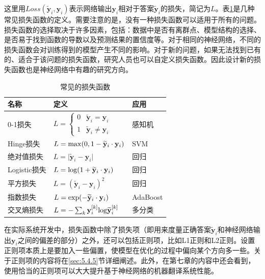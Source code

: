 \parinterval 这里用$ Loss(\mathbf {\widetilde y}_i,\mathbf y_i) $表示网络输出$ \mathbf y_i $相对于答案$ \mathbf {\widetilde y}_i $的损失，简记为$ L $。表\ref{tab:5-3}是几种常见损失函数的定义。需要注意的是，没有一种损失函数可以适用于所有的问题。损失函数的选择取决于许多因素，包括：数据中是否有离群点、模型结构的选择、是否易于找到函数的导数以及预测结果的置信度等。对于相同的神经网络，不同的损失函数会对训练得到的模型产生不同的影响。对于新的问题，如果无法找到已有的、适合于该问题的损失函数，研究人员也可以自定义损失函数。因此设计新的损失函数也是神经网络中有趣的研究方向。

\begin{table}[htp]
\centering
\caption{常见的损失函数}
\label{tab:5-3}
\small
\begin{tabular}{l | l l}
\rule{0pt}{15pt}     名称 & 定义 & 应用  \\
\hline
\rule{0pt}{15pt}     0-1损失 & $ L=\begin{cases} 0 & \mathbf {\widetilde y}_i=\mathbf y_i \\1 & \mathbf {\widetilde y}_i\not =\mathbf y_i\end{cases} $ & 感知机  \\
\rule{0pt}{15pt}     Hinge损失 & $ L={\rm {max}}(0,1-\mathbf {\widetilde y}_i\cdot \mathbf y_i) $ & SVM  \\
\rule{0pt}{15pt}     绝对值损失 & $ L=\vert \mathbf {\widetilde y}_i-\mathbf y_i\vert $ & 回归  \\
\rule{0pt}{15pt}     Logistic损失 & $ L={\rm{log}}(1+\mathbf {\widetilde y}_i\cdot \mathbf y_i) $ & 回归  \\
\rule{0pt}{15pt}     平方损失 & $ L={(\mathbf {\widetilde y}_i-\mathbf y_i)}^2 $ & 回归  \\
\rule{0pt}{15pt}     指数损失 & $ L={\rm{exp}}(-\mathbf {\widetilde y}_i\cdot \mathbf y_i) $ & AdaBoost  \\
\rule{0pt}{15pt}     交叉熵损失 & $ L=-\sum_{k}{\mathbf y_i^{[k]}{\rm {log}}\mathbf {\widetilde y}_i^{[k]}} $ & 多分类  \\
\end{tabular}
\end{table}

\parinterval 在实际系统开发中，损失函数中除了损失项（即用来度量正确答案$ \mathbf {\widetilde y}_i $和神经网络输出$ \mathbf y_i $之间的偏差的部分）之外，还可以包括正则项，比如L1正则和L2正则。设置正则项本质上是要加入一些偏置，使模型在优化的过程中偏向某个方向多一些。关于正则项的内容将在\ref{sec:5.4.5}节详细阐述。此外，在第七章的内容中还会看到，使用恰当的正则项可以大大提升基于神经网络的机器翻译系统性能。

